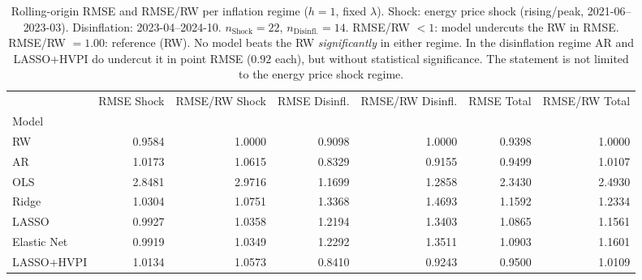 \begin{table}
\caption{Rolling-origin RMSE and RMSE/RW per inflation regime ($h=1$, fixed $\lambda$). Shock: energy price shock (rising/peak, 2021-06--2023-03). Disinflation: 2023-04--2024-10. $n_{\text{Shock}}=22$, $n_{\text{Disinfl.}}=14$. RMSE/RW $< 1$: model undercuts the RW in RMSE. RMSE/RW $= 1.00$: reference (RW). No model beats the RW \emph{significantly} in either regime. In the disinflation regime AR and LASSO+HVPI do undercut it in point RMSE ($0.92$ each), but without statistical significance. The statement is not limited to the energy price shock regime.}
\label{tab:regime}
\begin{tabular}{lrrrrrr}
\toprule
 & RMSE Shock & RMSE/RW Shock & RMSE Disinfl. & RMSE/RW Disinfl. & RMSE Total & RMSE/RW Total \\
Model &  &  &  &  &  &  \\
\midrule
RW & 0.9584 & 1.0000 & 0.9098 & 1.0000 & 0.9398 & 1.0000 \\
AR & 1.0173 & 1.0615 & 0.8329 & 0.9155 & 0.9499 & 1.0107 \\
OLS & 2.8481 & 2.9716 & 1.1699 & 1.2858 & 2.3430 & 2.4930 \\
Ridge & 1.0304 & 1.0751 & 1.3368 & 1.4693 & 1.1592 & 1.2334 \\
LASSO & 0.9927 & 1.0358 & 1.2194 & 1.3403 & 1.0865 & 1.1561 \\
Elastic Net & 0.9919 & 1.0349 & 1.2292 & 1.3511 & 1.0903 & 1.1601 \\
LASSO+HVPI & 1.0134 & 1.0573 & 0.8410 & 0.9243 & 0.9500 & 1.0109 \\
\bottomrule
\end{tabular}
\end{table}
